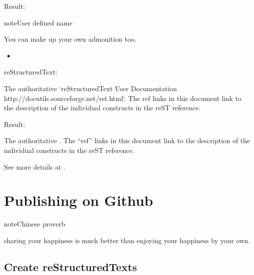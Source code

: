 \documentclass[letterpaper,12pt,english]{sphinxmanual}
\begin{document}
Result:

\begin{sphinxadmonition}{note}{User defined name}

You can make up your own admonition too.
\end{sphinxadmonition}
\begin{itemize}
\item {} 

\end{itemize}

reStructuredText:

\begin{sphinxVerbatim}[commandchars=\\\{\}]
 

   The authoritative {}`reStructuredText User Documentation
   \PYGZlt{}http://docutils.sourceforge.net/rst.html\PYGZgt{}{}`\PYGZus{}.  The \PYGZdq{}ref\PYGZdq{} links in this
   document link to the description of the individual constructs in the reST
   reference.
\end{sphinxVerbatim}

Result:




The authoritative .  The “ref” links in this
document link to the description of the individual constructs in the reST
reference.



See more details at .


\chapter{Publishing on Github}
\label{\detokenize{github:publishing-on-github}}\label{\detokenize{github:github}}\label{\detokenize{github::doc}}
\begin{sphinxadmonition}{note}{Chinese proverb}

sharing your happiness is much better than enjoying your happiness by your own.
\end{sphinxadmonition}


\section{Create reStructuredTexts}
\label{\detokenize{github:create-rests}}
\end{document}
